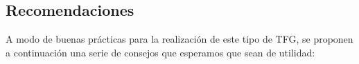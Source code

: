 
\subsection{Recomendaciones}\label{tfx_inves_ss_recomendaiones}

A modo de buenas prácticas para la realización de este tipo de TFG, se proponen a continuación una serie de consejos que esperamos que sean de utilidad:

